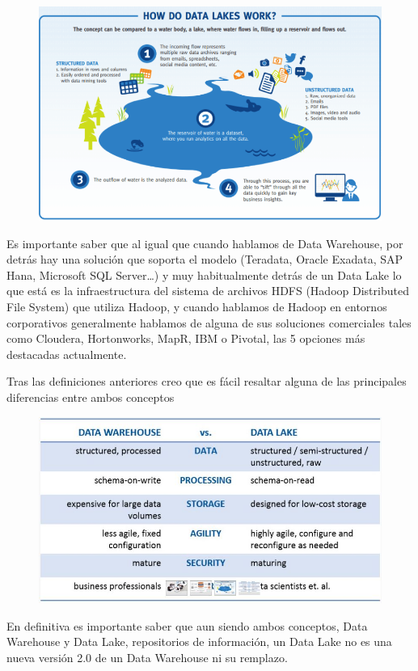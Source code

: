 \documentclass[preprint,12pt]{elsarticle}
\begin{document}
\begin{figure}[htb]
				\begin{center}
					\includegraphics[width=15cm]{./IMAGENES/fiorella2}
				\end{center}
			\end{figure}

Es importante saber que al igual que cuando hablamos de Data Warehouse, por detrás hay una solución que soporta el modelo (Teradata, Oracle Exadata, SAP Hana, Microsoft SQL Server…) y muy habitualmente detrás de un Data Lake lo que está es la infraestructura del sistema de archivos HDFS (Hadoop Distributed File System) que utiliza Hadoop, y cuando hablamos de Hadoop en entornos corporativos generalmente hablamos de alguna de sus soluciones comerciales tales como Cloudera, Hortonworks, MapR, IBM o Pivotal, las 5 opciones más destacadas actualmente.

Tras las definiciones anteriores creo que es fácil resaltar alguna de las principales diferencias entre ambos conceptos

\begin{figure}[htb]
				\begin{center}
					\includegraphics[width=15cm]{./IMAGENES/fiorella3}
				\end{center}
			\end{figure}
En definitiva es importante saber que aun siendo ambos conceptos, Data Warehouse y Data Lake, repositorios de información, un Data Lake no es una nueva versión 2.0 de un Data Warehouse ni su remplazo.
\end{document}

